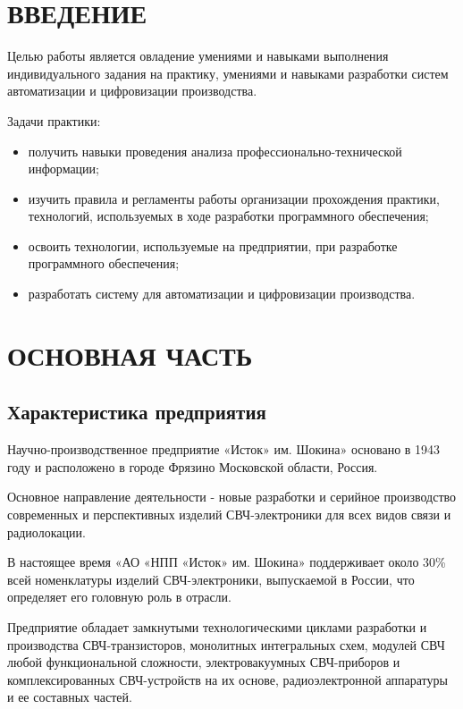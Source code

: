 \documentclass[a4paper,14pt]{extreport}
\begin{document}
	\setcounter{page}{3}
	
	\def\contentsname{СОДЕРЖАНИЕ}
	
	\tableofcontents
	
	\chapter*{ВВЕДЕНИЕ}
	
	Целью работы является овладение умениями и навыками выполнения индивидуального задания на практику, умениями и навыками разработки систем автоматизации и цифровизации производства.
	
	Задачи практики:
	\begin{itemize}
		\item получить навыки проведения анализа профессионально-технической информации; 
		\item изучить правила и регламенты работы организации прохождения практики, технологий, используемых в ходе разработки программного обеспечения;
		\item освоить технологии, используемые на предприятии, при разработке программного обеспечения;
		\item разработать систему для автоматизации и цифровизации производства.
	\end{itemize}

	\chapter{ОСНОВНАЯ ЧАСТЬ}

	\section{Характеристика предприятия} 
	Научно-производственное предприятие «Исток» им. Шокина» основано в 1943 году и расположено в городе Фрязино Московской области, Россия.
	
	Основное направление деятельности - новые разработки и серийное производство современных и перспективных изделий СВЧ-электроники для всех видов связи и радиолокации.
	
	В настоящее время «АО «НПП «Исток» им. Шокина» поддерживает около 30\% всей номенклатуры изделий СВЧ-электроники, выпускаемой в России, что определяет его головную роль в отрасли.
	
	Предприятие обладает замкнутыми технологическими циклами разработки и производства СВЧ-транзисторов, монолитных интегральных схем, модулей СВЧ любой функциональной сложности, электровакуумных СВЧ-приборов и комплексированных СВЧ-устройств на их основе, радиоэлектронной аппаратуры и ее составных частей.
	
\end{document}
